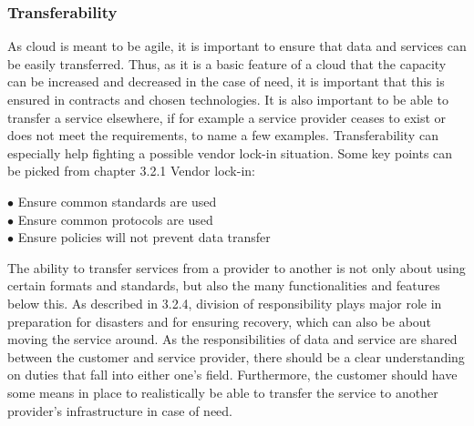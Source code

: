 \documentclass{article}
\begin{document}
\subsubsection{Transferability}
As cloud is meant to be agile, it is important to ensure that data and services can be easily transferred. Thus, as it is a basic feature of a cloud that the capacity can be increased and decreased in the case of need, it is important that this is ensured in contracts and chosen technologies. It is also important to be able to transfer a service elsewhere, if for example a service provider ceases to exist or does not meet the requirements, to name a few examples. Transferability can especially help fighting a possible vendor lock-in situation. Some key points can be picked from chapter 3.2.1 Vendor lock-in:
\begin{description}
	\item[$\bullet$ Ensure common standards are used]
	\item[$\bullet$ Ensure common protocols are used]
	\item[$\bullet$ Ensure policies will not prevent data transfer]
\end{description}

\par
The ability to transfer services from a provider to another is not only about using certain formats and standards, but also the many functionalities and features below this. As described in 3.2.4, division of responsibility plays major role in preparation for disasters and for ensuring recovery, which can also be about moving the service around. As the responsibilities of data and service are shared between the customer and service provider, there should be a clear understanding on duties that fall into either one's field. Furthermore, the customer should have some means in place to realistically be able to transfer the service to another provider's infrastructure in case of need.
\end{document}
